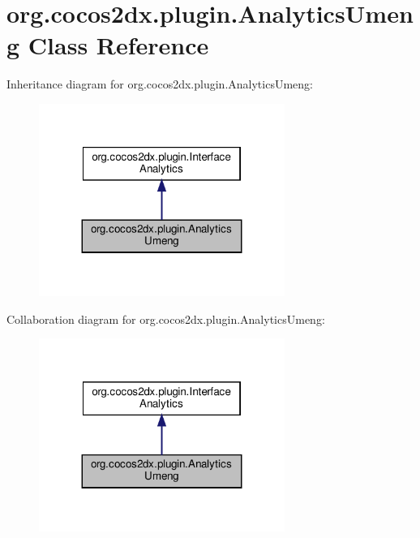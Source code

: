 \hypertarget{classorg_1_1cocos2dx_1_1plugin_1_1AnalyticsUmeng}{}\section{org.\+cocos2dx.\+plugin.\+Analytics\+Umeng Class Reference}
\label{classorg_1_1cocos2dx_1_1plugin_1_1AnalyticsUmeng}


Inheritance diagram for org.\+cocos2dx.\+plugin.\+Analytics\+Umeng\+:
\nopagebreak
\begin{figure}[H]
\begin{center}
\leavevmode
\includegraphics[width=227pt]{classorg_1_1cocos2dx_1_1plugin_1_1AnalyticsUmeng__inherit__graph}
\end{center}
\end{figure}


Collaboration diagram for org.\+cocos2dx.\+plugin.\+Analytics\+Umeng\+:
\nopagebreak
\begin{figure}[H]
\begin{center}
\leavevmode
\includegraphics[width=227pt]{classorg_1_1cocos2dx_1_1plugin_1_1AnalyticsUmeng__coll__graph}
\end{center}
\end{figure}
